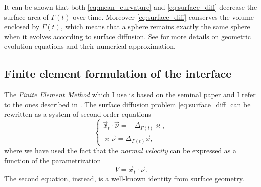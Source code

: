 \documentclass[a4paper,11pt, onecolumn]{article}
\newcommand{\cor}[1]{\textit{#1}} %
\begin{document}
\noindent It can be shown that both \eqref{eq:mean_curvature} and \eqref{eq:surface_diff} decrease the surface area of $\Gamma(t)$ over time. Moreover \eqref{eq:surface_diff} conserves the volume enclosed by $\Gamma(t)$, which means that a sphere remains exactly the same sphere when it evolves according to surface diffusion. See \cite{DeckelnickDE05} for more details on geometric evolution equations and their numerical approximation.

\subsection{Finite element formulation of the interface}

The \cor{Finite Element Method} which I use is based on the seminal paper \cite{Dziuk91} and I refer to the ones described in \cite{triplej,triplejMC,gflows3d}. The surface diffusion problem \eqref{eq:surface_diff} can be rewritten as a system of second order equations
\begin{equation}\label{eq:surf_diff_sys}
 \begin{cases}
  \vec{x}_t\cdot\vec{\nu}=-\Delta_{\Gamma(t)} \varkappa,\\
  \varkappa\vec{\nu}=\Delta_{\Gamma(t)}\vec{x},
 \end{cases}
\end{equation}
where we have used the fact that the \cor{normal velocity} can be expressed as a function of the parametrization 
\begin{equation}
 V=\vec{x}_t\cdot\vec{\nu}.
\end{equation}
The second equation, instead, is a well-known identity from surface geometry.
\newline
\end{document}

